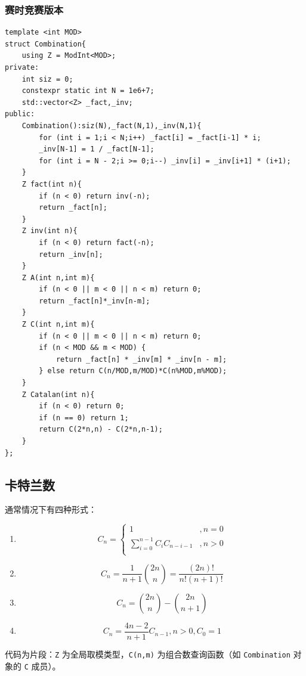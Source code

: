 \subsubsection{赛时竞赛版本}

\begin{lstlisting}
template <int MOD>
struct Combination{
    using Z = ModInt<MOD>;
private:
    int siz = 0;
    constexpr static int N = 1e6+7;
    std::vector<Z> _fact,_inv;
public:
    Combination():siz(N),_fact(N,1),_inv(N,1){
        for (int i = 1;i < N;i++) _fact[i] = _fact[i-1] * i;
        _inv[N-1] = 1 / _fact[N-1];
        for (int i = N - 2;i >= 0;i--) _inv[i] = _inv[i+1] * (i+1);
    }
    Z fact(int n){
        if (n < 0) return inv(-n);
        return _fact[n];
    }
    Z inv(int n){
        if (n < 0) return fact(-n);
        return _inv[n];
    }
    Z A(int n,int m){
        if (n < 0 || m < 0 || n < m) return 0;
        return _fact[n]*_inv[n-m];
    }
    Z C(int n,int m){
        if (n < 0 || m < 0 || n < m) return 0;
        if (n < MOD && m < MOD) {
            return _fact[n] * _inv[m] * _inv[n - m];
        } else return C(n/MOD,m/MOD)*C(n%MOD,m%MOD);
    }
    Z Catalan(int n){
        if (n < 0) return 0;
        if (n == 0) return 1;
        return C(2*n,n) - C(2*n,n-1);
    }
};
\end{lstlisting}

\subsection{卡特兰数}

通常情况下有四种形式：

\begin{enumerate}
    \item $$C_n = \begin{cases}
        1 & ,n=0\\
        \sum_{i=0}^{n-1} C_iC_{n-i-1}&,n > 0\\
    \end{cases}$$
    \item $$C_n=\frac{1}{n+1}\binom{2n}{n}=\frac{(2n)!}{n!(n+1)!}$$
    \item $$C_n=\binom{2n}{n} - \binom{2n}{n+1}$$
    \item $$C_n=\frac{4n-2}{n+1}C_{n-1},n > 0,C_0 = 1$$
\end{enumerate}

代码为片段：\texttt{Z} 为全局取模类型，\texttt{C(n,m)} 为组合数查询函数（如 \texttt{Combination} 对象的 \texttt{C} 成员）。

